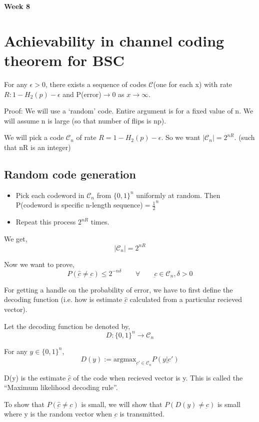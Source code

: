 \documentclass{article}
\begin{document}
\begin{center}
\textbf{\huge{Week 8}}
\end{center}

\section{Achievability in channel coding theorem for BSC}

For any $\epsilon > 0$, there exists a sequence of codes $\mathscr{C}$(one for each x) with rate $R: 1 - H_2(p)- \epsilon$ and P(error)$\to 0$ as $x \to \infty$.

Proof: We will use a `random' code. Entire argument is for a fixed value of n. We will assume n is large (so that number of flips is np).

We will pick a code $\mathscr{C}_n$ of rate $R= 1-H_2(p)- \epsilon$. So we want $|\mathscr{C}_n|= 2^{nR}.$ (such that nR is an integer)

\subsection{Random code generation}
\begin{itemize}
    \item Pick each codeword in $\mathscr{C}_n$ from $\{ 0,1\}^n$ uniformly at random. Then P(codeword is specific n-length sequence)$= \frac{1}{2}^n$
    \item Repeat this process $2^{nR}$ times.
\end{itemize}

We get,
$$ |\mathscr{C}_n|=2^{nR}$$

Now we want to prove,
$$ P(\hat{\underbar{c}} \neq \underbar{c}) \leq  2^{-n \delta} \qquad \forall \qquad \underbar{c} \in \mathscr{C}_n , \delta > 0$$

For getting a handle on the probability of error, we have to first define the decoding function (i.e. how is estimate $\hat{\underbar{c}}$ calculated from a particular recieved vector).

Let the decoding function be denoted by,
$$D : \{ 0,1 \}^n \to \mathscr{C}_n$$

For any $y \in \{ 0,1 \}^n$,
$$ D(y):= \text{argmax}_{\underbar{c}' \in \mathscr{C}_n} P(y|\underbar{c}')$$

D(y) is the estimate $\hat{\underbar{c}}$ of the code when recieved vector is y. This is called the ``Maximum likelihood decoding rule''.

To show that $P(\hat{\underbar{c}} \neq \underbar{c})$ is small, we will show that $P(D(y) \neq \underbar{c})$ is small where y is the random vector when $\underbar{c}$ is transmitted.
\end{document}

